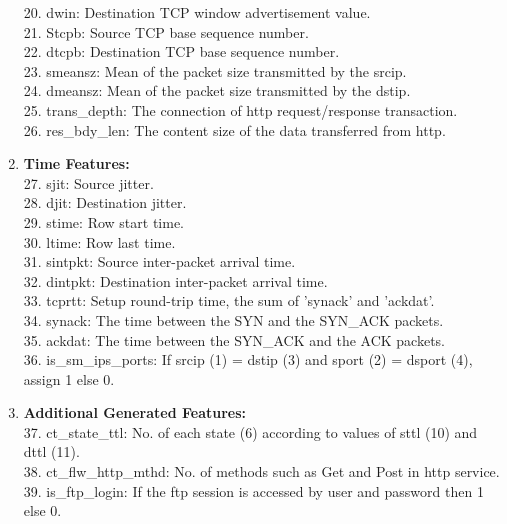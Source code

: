 \documentclass[a4paper,12pt]{article}
\begin{document}
\begin{enumerate}
                    20. dwin: Destination TCP window advertisement value. \\
                    21. Stcpb: Source TCP base sequence number. \\
                    22. dtcpb: Destination TCP base sequence number. \\
                    23. smeansz: Mean of the packet size transmitted by the srcip. \\
                    24. dmeansz: Mean of the packet size transmitted by the dstip. \\
                    25. trans\_depth: The connection of http request/response transaction. \\
                    26. res\_bdy\_len: The content size of the data transferred from http.
                \item \textbf{Time Features:} \\
                    27. sjit: Source jitter. \\
                    28. djit: Destination jitter. \\
                    29. stime: Row start time. \\
                    30. ltime: Row last time. \\
                    31. sintpkt: Source inter-packet arrival time. \\
                    32. dintpkt: Destination inter-packet arrival time. \\
                    33. tcprtt: Setup round-trip time, the sum of ’synack’ and ’ackdat’. \\
                    34. synack: The time between the SYN and the SYN\_ACK packets. \\
                    35. ackdat: The time between the SYN\_ACK and the ACK packets. \\
                    36. is\_sm\_ips\_ports: If srcip (1) = dstip (3) and sport (2) = dsport (4), assign 1 else 0.
                \item \textbf{Additional Generated Features:} \\
                    37. ct\_state\_ttl: No. of each state (6) according to values of sttl (10) and dttl (11). \\
                    38. ct\_flw\_http\_mthd: No. of methods such as Get and Post in http service. \\
                    39. is\_ftp\_login: If the ftp session is accessed by user and password then 1 else 0. \\

\end{enumerate}
\end{document}
